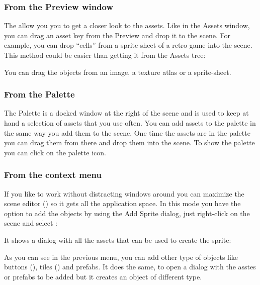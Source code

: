 \documentclass[letterpaper,10pt,english]{sphinxmanual}
\begin{document}
\subsubsection{From the Preview window}
\label{\detokenize{canvas:from-the-preview-window}}
The  allow you you to get a closer look to the assets. Like in the Assets window, you can drag an asset key from the Preview and drop it to the scene. For example, you can drop “cells” from a sprite-sheet of a retro game into the scene. This method could be easier than getting it from the Assets tree:

\noindent{}

You can drag the objects from an image, a texture atlas or a sprite-sheet.


\subsubsection{From the Palette}
\label{\detokenize{canvas:from-the-palette}}
The Palette is a docked window at the right of the scene and is used to keep at hand a selection of assets that you use often. You can add assets to the palette in the same way you add them to the scene. One time the assets are in the palette you can drag them from there and drop them into the scene. To show the palette you can click on the palette icon.

\noindent{}


\subsubsection{From the context menu}
\label{\detokenize{canvas:from-the-context-menu}}
If you like to work without distracting windows around you can maximize the scene editor () so it gets all the application space. In this mode you have the option to add the objects by using the Add Sprite dialog, just right-click on the scene and select :

\noindent{}

It shows a dialog with all the assets that can be used to create the sprite:

\noindent{}

As you can see in the previous menu, you can add other type of objects like buttons (), tiles () and prefabs. It does the same, to open a dialog with the asstes or prefabs to be added but it creates an object of different type.
\end{document}

